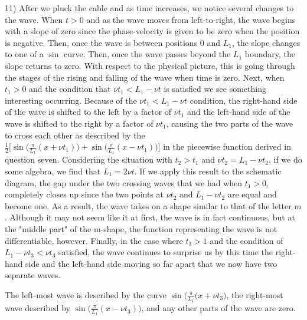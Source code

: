 \documentclass[executivepaper]{article}
\begin{document}
\begin{flushleft}

11) After we pluck the cable and as time increases, we notice several changes to the wave. When $t > 0$ and as the wave moves from left-to-right, the wave begins with a slope of zero since the phase-velocity is given to be zero when the position is negative. Then, once the wave is between positions $0$ and $L_{1}$, the slope changes to one of a $\sin$ curve. Then, once the wave passes beyond the $L_{1}$ boundary, the slope returns to zero. With respect to the physical picture, this is going through the stages of the rising and falling of the wave when time is zero. Next, when $t_{1} > 0$ and the condition that $\nu t_{1} < L_{1}-\nu t$ is satisfied we see something interesting occurring. Because of the $\nu t_{1} < L_{1}-\nu t$ condition, the right-hand side of the wave is shifted to the left by a factor of $\nu t_{1}$ and the left-hand side of the wave is shifted to the right by a factor of $\nu t_{1}$, causing the two parts of the wave to cross each other as described by the $\frac{1}{2} \bigg[\sin\bigg(\frac{\pi}{L_{1}} (x+\nu t_{1})\bigg)+\sin\bigg(\frac{\pi}{L_{1}} (x-\nu t_{1})\bigg)\bigg]$ in the piecewise function derived in question seven. Considering the situation with $t_{2} > t_{1}$ and $\nu t_{2}=L_{1}-\nu t_{2}$, if we do some algebra, we find that $L_{1}=2\nu t$. If we apply this result to the schematic diagram, the gap under the two crossing waves that we had when $t_{1} > 0$, completely closes up since the two points at $\nu t_{2}$ and $L_{1}-\nu t_{2}$ are equal and become one. As a result, the wave takes on a shape similar to that of the letter $m$. Although it may not seem like it at first, the wave is in fact continuous, but at the "middle part" of the m-shape, the function representing the wave is not differentiable, however. Finally, in the case where $t_{3} > 1$ and the condition of $L_{1}-\nu t_{3} < \nu t_{3}$ satisfied, the wave continues to surprise us by this time the right-hand side and the left-hand side moving so far apart that we now have two separate waves. 

\pagebreak

\vspace*{-40mm}

The left-most wave is described by the curve $\sin\bigg(\frac{\pi}{L_{1}} (x+\nu t_{3}\bigg)$, the right-most wave described by $\sin\bigg(\frac{\pi}{L_{1}} (x-\nu t_{3})\bigg)$, and any other parts of the wave are zero.

\end{flushleft}
\end{document}
